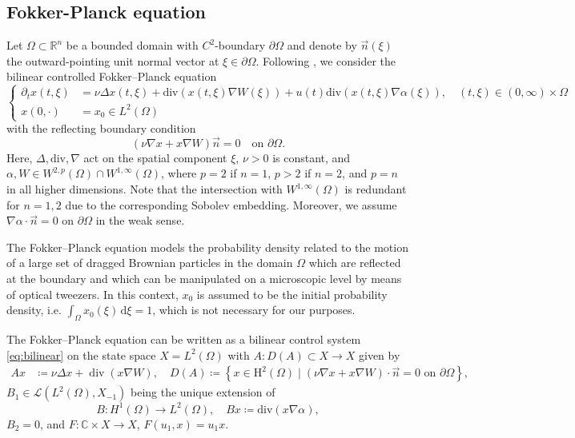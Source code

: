 \documentclass{cocv}
\newcommand{\RR}{\mathbb R}
\newcommand{\CC}{\mathbb C}
\theoremstyle{definition}
\begin{document}
\subsection{Fokker-Planck equation}
\label{ssec:fokker}
    Let $\Omega \subset \RR^n$ be a bounded domain with $C^2$-boundary $\partial\Omega$ and denote by $\vec n(\xi)$ the outward-pointing unit normal vector at $\xi \in \partial\Omega$. Following \cite{Breiten18}, we consider the bilinear controlled Fokker--Planck equation
    \begin{equation}\label{eq:fokker_pl}
        \left\{
        \begin{aligned}
            \partial_t x(t,\xi) &= \nu \Delta x(t,\xi) + \mathrm{div}(x(t,\xi) \nabla W(\xi)) + u(t)\mathrm{div}(x(t,\xi)\nabla \alpha(\xi)),\quad (t,\xi) \in (0,\infty) \times \Omega\\
            x(0,\cdot) &= x_0 \in L^2(\Omega)
        \end{aligned}
        \right.
    \end{equation}
    with the reflecting boundary condition
    \begin{equation*}
        (\nu \nabla x + x \nabla W) \vec{n} =0 \quad \text{on } \partial \Omega.
    \end{equation*}
    Here, $\Delta, \mathrm{div}, \nabla$ act on the spatial component $\xi$, $\nu > 0$ is constant, and $\alpha, W \in W^{2,p}(\Omega) \cap W^{1,\infty}(\Omega)$, where $p = 2$ if $n=1$, $p>2$ if $n=2$, and $p = n$ in all higher dimensions. Note that the intersection with $W^{1,\infty}(\Omega)$ is redundant for $n=1,2$ due to the corresponding Sobolev embedding. Moreover, we assume $\nabla\alpha \cdot \vec n = 0$ on $\partial\Omega$ in the weak sense.

    The Fokker--Planck equation models the probability density related to the motion of a large set of dragged Brownian particles in the domain $\Omega$ which are reflected at the boundary and which can be manipulated on a microscopic level by means of optical tweezers. In this context, $x_0$ is assumed to be the initial probability density, i.e. $\int_\Omega x_0(\xi) \,\mathrm{d} \xi = 1$, which is not necessary for our purposes.

    The Fokker--Planck equation can be written as a bilinear control system \eqref{eq:bilinear}
    on the state space $X= L^2(\Omega)$ with $A: D(A) \subset X \to X$ given by
    \begin{equation*}
        \begin{aligned}
            Ax &\coloneqq \nu \Delta x+\operatorname{div}(x \nabla W),\quad D(A) \coloneqq \left\{x \in \mathrm{H}^2(\Omega) \mid(\nu \nabla x+x \nabla W) \cdot \vec{n}=0 \text { on } \partial \Omega\right\},
        \end{aligned}
    \end{equation*}
    $B_1 \in \mathcal{L}(L^2(\Omega),X_{-1})$ being the unique extension of
    \begin{equation*}
        B \colon H^1(\Omega) \to L^2(\Omega), \quad Bx \coloneqq \mathrm{div}(x\nabla \alpha),
    \end{equation*}
    $B_2=0$, and $F\colon \CC \times X \to X$, $F(u_1,x) = u_1 x$. 
 
\end{document}
